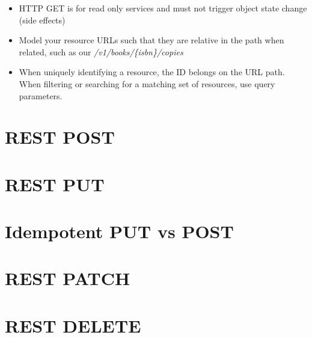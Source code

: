 \begin{itemize}
  \item HTTP GET is for read only services and must not trigger object state change (side effects)
  \item Model your resource URLs such that they are relative in the path when related, such as our \textit{/v1/books/\{isbn\}/copies}
  \item When uniquely identifying a resource, the ID belongs on the URL path.  When filtering or searching for a matching set of resources, use query parameters.
\end{itemize}

\section{REST POST}
\section{REST PUT}
\section{Idempotent PUT vs POST}
\section{REST PATCH}
\section{REST DELETE}

